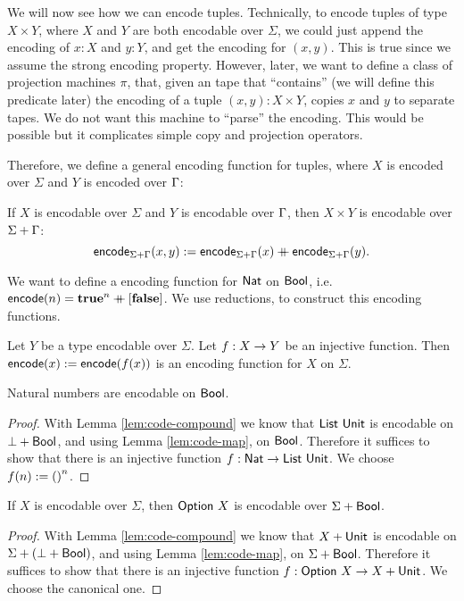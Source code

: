 \documentclass{psartcl}
\begin{document}
We will now see how we can encode tuples.
Technically, to encode tuples of type $X \times Y$, where $X$ and $Y$ are both encodable over $\Sigma$, we could just append the encoding of $x:X$
and $y:Y$, and get the encoding for $(x, y)$.
This is true since we assume the strong encoding property.
However, later, we want to define a class of projection machines $\pi$, that, given an tape that ``contains'' (we will define this predicate later)
the encoding of a tuple $(x,y) : X \times Y$, copies $x$ and $y$ to separate tapes.
We do not want this machine to ``parse'' the encoding.  This would be possible but it complicates simple copy and projection operators.

Therefore, we define a general encoding function for tuples, where $X$ is encoded over $\Sigma$ and $Y$ is encoded over $\Gamma$:
\begin{lemma}
  If $X$ is encodable over $\Sigma$ and $Y$ is encodable over $\Gamma$, then $X \times Y$ is encodable over $\Sigma + \Gamma$:
  $$\textsf{encode}_{\Sigma+\Gamma}(x,y) := \textsf{encode}_{\Sigma+\Gamma}(x) \mathbin{+\mkern-10mu+} \textsf{encode}_{\Sigma+\Gamma}(y).$$
\end{lemma}


We want to define a encoding function for $\textsf{Nat}$ on $\textsf{Bool}$, i.e. $\textsf{encode}(n)=\mathbf{true}^n \mathbin{+\mkern-10mu+} [\mathbf{false}]$.
We use reductions, to construct this encoding functions.

\begin{lemma}
  \label{lem:code-reduce}
  Let $Y$ be a type encodable over $\Sigma$.
  Let $f : X \rightarrow Y$ be an injective function.
  Then $\textsf{encode}(x) := \textsf{encode}(f(x))$ is an encoding function for $X$ on $\Sigma$.
\end{lemma}

\begin{corollary}
  \label{lem:code-nat}
  Natural numbers are encodable on $\textsf{Bool}$.
\end{corollary}
\begin{proof}
  With Lemma \ref{lem:code-compound} we know that $\textsf{List}~\textsf{Unit}$ is encodable on $\bot + \textsf{Bool}$, and using Lemma \ref{lem:code-map}, on $\textsf{Bool}$.
  Therefore it suffices to show that there is an injective function $f : \textsf{Nat} \rightarrow \textsf{List}~\textsf{Unit}$.
  We choose $f(n) := \mathbf{()}^n$.
\end{proof}

\begin{corollary}
  \label{lem:code-option}
  If $X$ is encodable over $\Sigma$, then
  $\textsf{Option}~X$ is encodable over $\Sigma + \textsf{Bool}$.
\end{corollary}
\begin{proof}
  With Lemma \ref{lem:code-compound} we know that $X + \textsf{Unit}$ is encodable on $\Sigma + (\bot + \textsf{Bool})$, and using Lemma \ref{lem:code-map}, on
  $\Sigma + \textsf{Bool}$.  Therefore it suffices to show that there is an injective function $f : \textsf{Option}~X \rightarrow X + \textsf{Unit}$.
  We choose the canonical one.
\end{proof}
\end{document}
